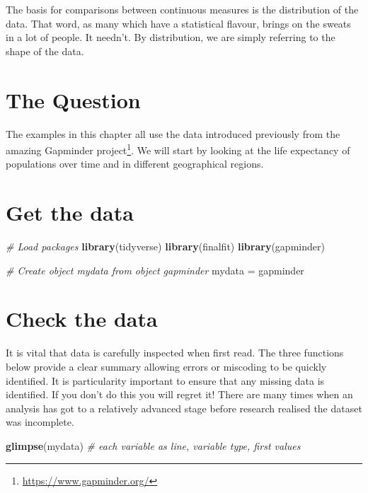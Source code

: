 \documentclass[12pt,]{krantz}
\makeatletter
\newenvironment{Shaded}{\begin{snugshade}}{\end{snugshade}}
\newcommand{\CommentTok}[1]{\textcolor[rgb]{0.56,0.35,0.01}{\textit{#1}}}
\newcommand{\KeywordTok}[1]{\textcolor[rgb]{0.13,0.29,0.53}{\textbf{#1}}}
\newcommand{\NormalTok}[1]{#1}
\newcommand{\StringTok}[1]{\textcolor[rgb]{0.31,0.60,0.02}{#1}}
\renewcommand{\href}[2]{#2\footnote{\url{#1}}}
\newenvironment{kframe}{%
\medskip{}
\setlength{\fboxsep}{.8em}
 \def\at@end@of@kframe{}%
 \ifinner\ifhmode%
  \def\at@end@of@kframe{\end{minipage}}%
  \begin{minipage}{\columnwidth}%
 \fi\fi%
 \def\FrameCommand##1{\hskip\@totalleftmargin \hskip-\fboxsep
 \colorbox{shadecolor}{##1}\hskip-\fboxsep
     \hskip-\linewidth \hskip-\@totalleftmargin \hskip\columnwidth}%
 \MakeFramed {\advance\hsize-\width
   \@totalleftmargin\z@ \linewidth\hsize
   \@setminipage}}%
 {\par\unskip\endMakeFramed%
 \at@end@of@kframe}
\renewenvironment{Shaded}{\begin{kframe}}{\end{kframe}}
\theoremstyle{definition}
\theoremstyle{definition}
\theoremstyle{definition}
\theoremstyle{remark}
\makeatother
\begin{document}
The basis for comparisons between continuous measures is the
distribution of the data. That word, as many which have a statistical
flavour, brings on the sweats in a lot of people. It needn't. By
distribution, we are simply referring to the shape of the data.

\hypertarget{the-question}{%
\section{The Question}\label{the-question}}

The examples in this chapter all use the data introduced previously from
the amazing \href{https://www.gapminder.org/}{Gapminder project}. We
will start by looking at the life expectancy of populations over time
and in different geographical regions.

\hypertarget{get-the-data}{%
\section{Get the data}\label{get-the-data}}

\begin{Shaded}
\begin{Highlighting}[]
\CommentTok{# Load packages}
\KeywordTok{library}\NormalTok{(tidyverse)}
\KeywordTok{library}\NormalTok{(finalfit)}
\KeywordTok{library}\NormalTok{(gapminder)}

\CommentTok{# Create object mydata from object gapminder}
\NormalTok{mydata =}\StringTok{ }\NormalTok{gapminder}
\end{Highlighting}
\end{Shaded}

\hypertarget{check-the-data}{%
\section{Check the data}\label{check-the-data}}

It is vital that data is carefully inspected when first read. The three
functions below provide a clear summary allowing errors or miscoding to
be quickly identified. It is particularity important to ensure that any
missing data is identified. If you don't do this you will regret it!
There are many times when an analysis has got to a relatively advanced
stage before research realised the dataset was incomplete.

\begin{Shaded}
\begin{Highlighting}[]
\KeywordTok{glimpse}\NormalTok{(mydata) }\CommentTok{# each variable as line, variable type, first values}
\end{Highlighting}
\end{Shaded}
\end{document}
